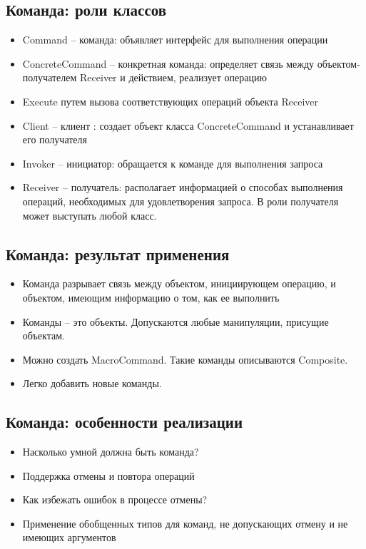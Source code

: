 \subsection{Команда: роли классов}
\begin{itemize}
    \item Command – команда: объявляет интерфейс для выполнения операции
    \item ConcreteCommand – конкретная команда: определяет связь между объектом-получателем Receiver и действием, реализует операцию
    \item Execute путем вызова соответствующих операций объекта Receiver
    \item Client – клиент : создает объект класса ConcreteCommand и устанавливает его получателя
    \item Invoker – инициатор: обращается к команде для выполнения запроса
    \item Receiver – получатель: располагает информацией о способах выполнения операций, необходимых для удовлетворения запроса. В роли получателя может выступать любой класс.
\end{itemize}
\subsection{Команда: результат применения}
\begin{itemize}
    \item Команда разрывает связь между объектом, инициирующем операцию, и объектом, имеющим информацию о том, как ее выполнить
    \item Команды – это объекты. Допускаются любые манипуляции, присущие объектам.
    \item Можно создать MacroCommand. Такие команды описываются Composite.
    \item Легко добавить новые команды.
\end{itemize}
\subsection{Команда: особенности реализации}
\begin{itemize}
    \item Насколько умной должна быть команда?
    \item Поддержка отмены и повтора операций
    \item Как избежать ошибок в процессе отмены?
    \item Применение обобщенных типов для команд, не допускающих отмену и не имеющих аргументов
\end{itemize}
